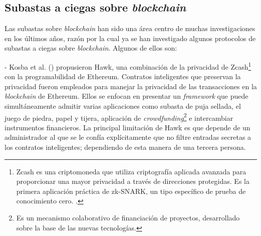   \subsection{Subastas a ciegas sobre \textit{blockchain}}\label{section:blind_auction_protocols}
    Las subastas sobre \textit{blockchain} han sido una área centro de muchas investigaciones en los últimos años, razón por la cual ya se
    han investigado algunos protocolos de subastas a ciegas sobre \textit{blockchain}. Algunos de ellos son:    

    - Kosba et al. (\citeyear{kosba2016hawk}) propusieron Hawk, una combinación de la privacidad de 
    Zcash\footnote{Zcash es una criptomoneda que 
    utiliza criptografía aplicada avanzada para proporcionar una mayor privacidad a través de direcciones 
    protegidas. Es la primera aplicación práctica de zk-SNARK, un tipo específico de prueba de 
    conocimiento cero. \parencite{zcash}.} 
    con la programabilidad
    de Ethereum. Contratos inteligentes que preservan la privacidad fueron empleados para manejar la 
    privacidad de las transacciones en la \textit{blockchain} de Ethereum. Ellos se enfocan en presentar
    un \textit{framework} que puede simultáneamente admitir varias aplicaciones como subasta de puja sellada,
    el juego de piedra, papel y tijera, aplicación de \textit{crowdfunding}\footnote{Es un mecanismo colaborativo de financiación de 
    proyectos, desarrollado sobre la base de las nuevas tecnologías.} e intercambiar instrumentos 
    financieros. La principal limitación de Hawk es que depende de un administrador al que se le confía
    explícitamente que no filtre entradas secretas a los contratos inteligentes; dependiendo de esta manera
    de una tercera persona.




